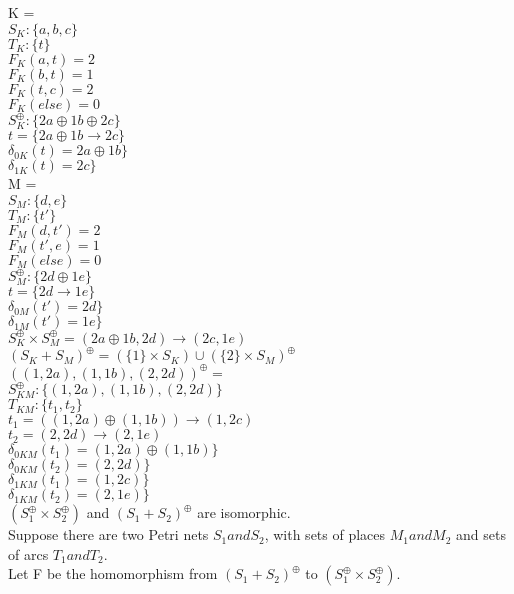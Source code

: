 %
K = \\
$S_K :\{ a, b, c\}$\\
$T_K :\{t\}$\\  
$F_K (a, t) = 2$\\
$F_K (b, t) = 1$\\
$F_K (t, c) = 2$\\
$F_K (else) = 0$\\
%
$S_K^\oplus :\{ 2a \oplus 1b \oplus 2c\}$\\
$t = \{ 2a \oplus 1b \to 2c \}$\\  
$\delta_{0K} (t) = 2a \oplus 1b \}$\\
$\delta_{1K} (t) = 2c \}$\\
\smallskip
M = \\
$S_M :\{d,e\}$\\
$T_M :\{t'\}$\\  
$F_M (d, t') = 2$\\
$F_M (t', e) = 1$\\
$F_M (else) = 0$\\
%
$S_M^\oplus :\{ 2d \oplus 1e\}$\\
$t = \{ 2d \to 1e \}$\\  
$\delta_{0M} (t') = 2d \}$\\
$\delta_{1M} (t') = 1e \}$\\
\smallskip
$S_K^\oplus \times S_M^\oplus = (2a \oplus 1b, 2d) \to (2c, 1e)$\\
\smallskip
$(S_K + S_M)^\oplus = (\{1\} \times S_K) \cup (\{2\} \times S_M)^\oplus$\\
$((1, 2a), (1, 1b), (2, 2d))^\oplus = $\\
$S_{KM}^\oplus: \{(1, 2a), (1, 1b), (2, 2d) \}$\\
$T_{KM}: \{t_1, t_2\}$\\
$t_1 = ((1, 2a) \oplus (1, 1b)) \to (1, 2c)$\\
$t_2 = (2, 2d) \to (2, 1e)$\\
$\delta_{0KM} (t_1) = (1, 2a) \oplus (1, 1b) \}$\\
$\delta_{0KM} (t_2) = (2, 2d) \}$\\
$\delta_{1KM} (t_1) = (1, 2c) \}$\\
$\delta_{1KM} (t_2) = (2, 1e) \}$\\
\smallskip
$(S_1 ^\oplus \times S_2 ^\oplus)$ and $(S_1 + S_2)^\oplus$ are isomorphic. \\
Suppose there are two Petri nets $S_1 and S_2$, with sets of places $M_1 and M_2$ and sets of arcs $T_1 and T_2.$\\
Let F be the homomorphism from $(S_1 + S_2)^\oplus$ to $(S_1 ^\oplus \times S_2 ^\oplus)$. \\
